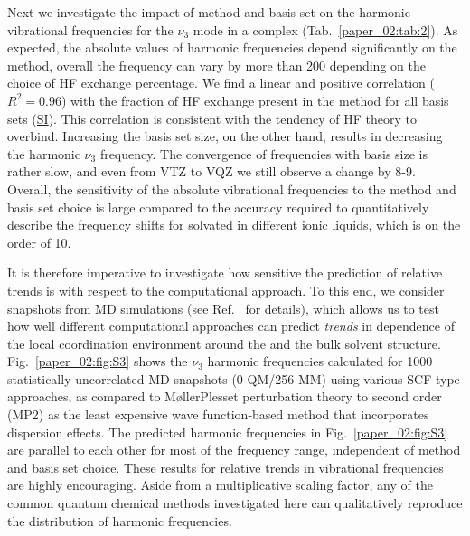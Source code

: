 \documentclass[%
  class = book,%
  crop = false,%
  float = true,%
  multi = true,%
  preview = false,%
]{standalone}
\begin{document}
Next we investigate the impact of method and basis set on the harmonic vibrational frequencies for the \(\nu_{3}\) mode in a \cotil complex (Tab.~\ref{paper_02:tab:2}). As expected, the absolute values of harmonic frequencies depend significantly on the method, overall the frequency can vary by more than \SI{200}{\wavenumber} depending on the choice of HF exchange percentage. We find a linear and positive correlation (\(R^{2} = 0.96\)) with the fraction of HF exchange present in the method for all basis sets (\hyperref[paper_02:sec:SI]{SI}). This correlation is consistent with the tendency of HF theory to overbind. Increasing the basis set size, on the other hand, results in decreasing the harmonic  \(\nu_{3}\) frequency. The convergence of frequencies with basis size is rather slow, and even from VTZ to VQZ we still observe a change by \num{8}-\SI{9}{\wavenumber}. Overall, the sensitivity of the absolute vibrational frequencies to the method and basis set choice is large compared to the accuracy required to quantitatively describe the frequency shifts for  solvated in different ionic liquids, which is on the order of \SI{10}{\wavenumber}.

It is therefore imperative to investigate how sensitive the prediction of relative trends is with respect to the computational approach. To this end, we consider snapshots from MD simulations (see Ref.~\parencite{Daly2016} for details), which allows us to test how well different computational approaches can predict \emph{trends} in dependence of the local coordination environment around the  and the bulk solvent structure. Fig.~\ref{paper_02:fig:S3} shows the  \(\nu_{3}\) harmonic frequencies calculated for \num{1000} statistically uncorrelated MD snapshots (0 QM/256 MM) using various SCF-type approaches, as compared to M\o{}ller\textendash{}Plesset perturbation theory to second order (MP2) as the least expensive wave function-based method that incorporates dispersion effects.\cite{WCMS:WCMS58} The predicted harmonic frequencies in Fig.~\ref{paper_02:fig:S3} are parallel to each other for most of the frequency range, independent of method and basis set choice. These results for relative trends in vibrational frequencies are highly encouraging. Aside from a multiplicative scaling factor, any of the common quantum chemical methods investigated here can qualitatively reproduce the distribution of harmonic frequencies.
\end{document}
